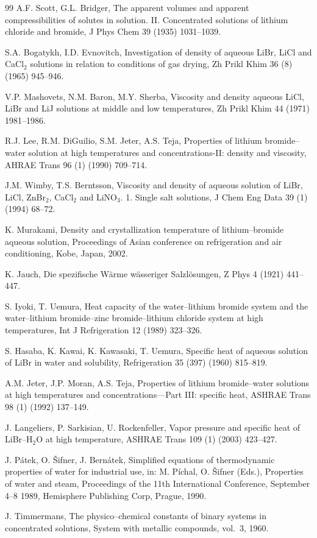 \documentclass[11pt]{article}
\begin{document}
\begin{thebibliography}{99}
 A.F. Scott, G.L. Bridger, The apparent volumes and
apparent compressibilities of solutes in solution. II. Concentrated
solutions of lithium chloride and bromide, J Phys Chem 39 (1935)
1031--1039.

 S.A. Bogatykh, I.D. Evnovitch, Investigation of density
of aqueous LiBr, LiCl and CaCl$_2$ solutions in relation to conditions
of gas drying, Zh Prikl Khim 36 (8) (1965) 945--946.

 V.P. Mashovets, N.M. Baron, M.Y. Sherba, Viscosity and
density aqueous LiCl, LiBr and LiJ solutions at middle and low
temperatures, Zh Prikl Khim 44 (1971) 1981--1986.

 R.J. Lee, R.M. DiGuilio, S.M. Jeter, A.S. Teja,
Properties of lithium bromide--water solution at high temperatures and
concentrations-II: density and viscosity, AHRAE Trans 96 (1) (1990)
709--714.

 J.M. Wimby, T.S. Berntsson, Viscosity and density of
aqueous solution of LiBr, LiCl, ZnBr$_2$, CaCl$_2$ and LiNO$_3$.
1. Single salt solutions, J Chem Eng Data 39 (1) (1994) 68--72.

 K. Murakami, Density and crystallization temperature of
lithium--bromide aqueous solution, Proceedings of Asian conference on
refrigeration and air conditioning, Kobe, Japan, 2002.

 K. Jauch, Die spezifische W\"arme w\"asseriger
Salzl\"osungen, Z Phys 4 (1921) 441--447.

 S. Iyoki, T. Uemura, Heat capacity of the water--lithium
bromide system and the water--lithium bromide--zinc bromide--lithium
chloride system at high temperatures, Int J Refrigeration 12 (1989)
323--326.

 S. Hasaba, K. Kawai, K. Kawasaki, T. Uemura, Specific
heat of aqueous solution of LiBr in water and solubility,
Refrigeration 35 (397) (1960) 815--819.

 A.M. Jeter, J.P. Moran, A.S. Teja, Properties of lithium
bromide--water solutions at high temperatures and
concentrations---Part III: specific heat, ASHRAE Trans 98 (1) (1992)
137--149.

 J. Langeliers, P. Sarkisian, U. Rockenfeller, Vapor
pressure and specific heat of LiBr--H$_2$O at high temperature, ASHRAE
Trans 109 (1) (2003) 423--427.

 J. P\'atek, O. \v{S}ifner, J. Bern\'atek, Simplified
equations of thermodynamic properties of water for industrial use, in:
M. P\'ichal, O. \v{S}ifner (Eds.), Properties of water and steam,
Proceedings of the 11th International Conference, September 4--8 1989,
Hemisphere Publishing Corp, Prague, 1990.

 J. Timmermans, The physico--chemical constants of binary
systems in concentrated solutions, System with metallic compounds,
vol.\ 3, 1960.

\end{thebibliography}
\end{document}
